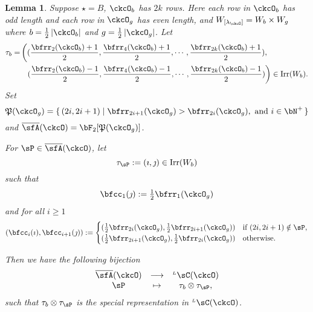 \documentclass[12pt,a4paper]{amsart}
\def\abs#1{\left|{#1}\right|}
\newcommand{\CQ}{{\mathcal {Q}}}
\numberwithin{equation}{section}
\newtheorem{lem}[thm]{Lemma}
\theoremstyle{remark}
\def\half{{\tfrac{1}{2}}}
\def\Irr{\mathrm{Irr}}
\def\WLamck{W_{[\lambda_{\ckcO}]}}
\def\LC{{}^{\scriptscriptstyle L}\sC}
\def\CQ{\overline{\sfA}}%
\def\CPP{\mathfrak{P}}
\begin{document}
\begin{lem}
  Suppose $\star = B$, $\ckcO_{b}$ has $2k$ rows. Here each row in $\ckcO_{b}$ has
  odd length and each row in $\ckcO_{g}$ has even length, and
  $\WLamck = W_{b}\times W_{g}$ where $b=\half \abs{\ckcO_{b}}$ and
  $g = \half\abs{\ckcO_{g}}$.
  Let
  \[
    \begin{split}
      \tau_{b} =  & \left( (\frac{\bfrr_{2}(\ckcO_{b})+1}{2}, \frac{\bfrr_{4}(\ckcO_{b})+1}{2}, \cdots, \frac{\bfrr_{2k}(\ckcO_{b})+1}{2}),\right.\\
        &\ \ \left. (\frac{\bfrr_{2}(\ckcO_{b})-1}{2}, \frac{\bfrr_{4}(\ckcO_{b})-1}{2}, \cdots, \frac{\bfrr_{2k}(\ckcO_{b})-1}{2})\right) \in \Irr(W_{b}).
    \end{split}
  \]
  Set
  \[
    \CPP(\ckcO_{g}) = \set{(2i,2i+1)| \bfrr_{2i+1}(\ckcO_{g})> \bfrr_{2i}(\ckcO_{g}), \text{
        and } i\in \bN^{+}}
  \]
  and $\CQ(\ckcO)= \bF_{2}[\CPP(\ckcO_{g})]$.

  For $\sP \in \CQ(\ckcO)$, let
  \[
    \tau_{\sP} := (\imath,\jmath) \in \Irr(W_{b})
  \]
  such that
  \[
    \bfcc_{1}(\jmath)  := \half\bfrr_{1}(\ckcO_{g})
  \]
  and for all $i\geq 1$
  \[
  (\bfcc_{i}(\imath), \bfcc_{i+1}(\jmath)):=
  \begin{cases}
    (\half \bfrr_{2i}(\ckcO_{g}), \half \bfrr_{2i+1}(\ckcO_{g}))
    & \text{if } (2i,2i+1)\notin \sP,\\
    (\half \bfrr_{2i+1}(\ckcO_{g}),\half \bfrr_{2i}(\ckcO_{g})) & \text{otherwise.}
  \end{cases}
  \]

  Then we have the following bijection
  \[
    \begin{array}{ccc}
      \CQ(\ckcO) &\longrightarrow & \LC(\ckcO)\\
      \sP & \mapsto & \tau_{b}\otimes \tau_{\sP},
    \end{array}
  \]
  such that $\tau_{b}\otimes \tau_{\sP}$ is the special representation in
  $\LC(\ckcO)$.
\end{lem}
\end{document}
